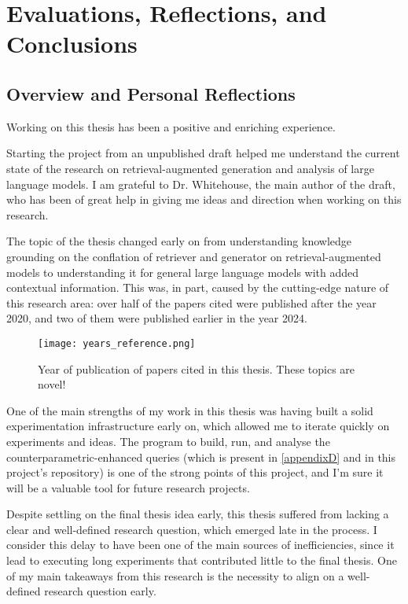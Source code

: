 \section{Evaluations, Reflections, and Conclusions}

\subsection{Overview and Personal Reflections}

Working on this thesis has been a positive and enriching experience.

Starting the project from an unpublished draft \citep{knowledge_grounding_retrieval_augmented} helped me understand the current state of the research on retrieval-augmented generation and analysis of large language models.
I am grateful to Dr. Whitehouse, the main author of the draft, who has been of great help in giving me ideas and direction when working on this research.

The topic of the thesis changed early on from understanding knowledge grounding on the conflation of retriever and generator on retrieval-augmented models to understanding it for general large language models with added contextual information.
This was, in part, caused by the cutting-edge nature of this research area: over half of the papers cited were published after the year 2020, and two of them were published earlier in the year 2024.

\begin{figure}[ht]
	\centering
	\texttt{[image: years\_reference.png]}
	\caption{Year of publication of papers cited in this thesis. These topics are novel!}
\end{figure}

One of the main strengths of my work in this thesis was having built a solid experimentation infrastructure early on, which allowed me to iterate quickly on experiments and ideas.
The program to build, run, and analyse the counterparametric-enhanced queries (which is present in \cref{appendixD} and in this project's repository) is one of the strong points of this project, and I'm sure it will be a valuable tool for future research projects.

Despite settling on the final thesis idea early, this thesis suffered from lacking a clear and well-defined research question, which emerged late in the process.
I consider this delay to have been one of the main sources of inefficiencies, since it lead to executing long experiments that contributed little to the final thesis.
One of my main takeaways from this research is the necessity to align on a well-defined research question early.

